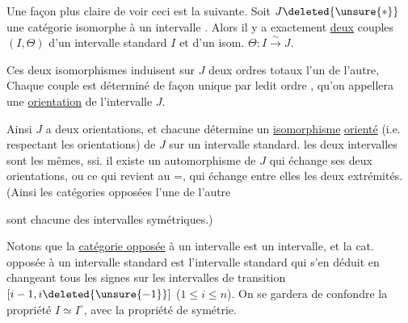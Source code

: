 
Une façon plus claire de voir ceci est la suivante. Soit $J\deleted{\unsure{*}}$ une catégorie  isomorphe à un intervalle . Alors il y a exactement  \uline{deux} couples $(I,\Theta)$ d'un intervalle standard $I$ et d'un isom. $\Theta:I\xrightarrow{\sim}J$.

Ces deux isomorphismes induisent sur $J$ deux ordres  totaux   l'un de l'autre,  Chaque couple est déterminé de façon unique par ledit ordre , qu'on appellera une \uline{orientation} de l'intervalle $J$.


Ainsi $J$ a deux orientations, et  chacune détermine un \uline{isomorphisme} \uline{orienté} (i.e. respectant les orientations) de $J$ sur un intervalle standard.  les deux intervalles sont les mêmes, ssi. il existe un automorphisme de $J$  qui échange ses deux orientations, ou ce qui revient au $\mathord{=}$, qui échange entre elles les deux extrémités. (Ainsi les catégories opposées l'une de l'autre

\diagram{\begin{tikzcd}[ampersand replacement=\&,column sep=small,row sep=small]
 \& \cdot\arrow[dl]\arrow[dr] \& \& \& \cdot \& \\
 \cdot \& \& \cdot \& \cdot\arrow[ur] \& \& \cdot\arrow[ul] \& {,}
\end{tikzcd}}

sont chacune des intervalles symétriques.) 

Notons que la \uline{catégorie opposée} à un intervalle est un intervalle,  et la cat. opposée à un intervalle standard  est  l'intervalle standard qui s'en déduit en changeant tous les signes sur les intervalles de transition $[i-1,i\deleted{\unsure{-1}}]$ ($1\leq i\leq n$). On se gardera de confondre la propriété $I\simeq I^{\circ}$, avec la propriété de symétrie.

